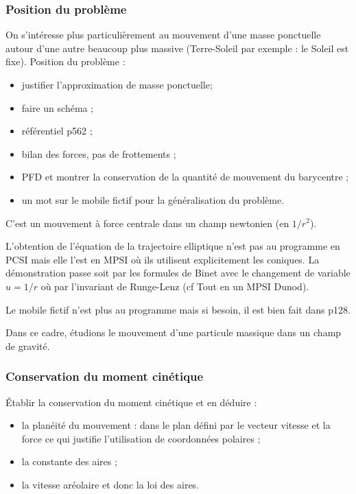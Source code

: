 \subsubsection{Position du problème}

On s'intéresse plus particulièrement au mouvement d'une masse ponctuelle autour d'une autre beaucoup plus massive (Terre-Soleil par exemple : le Soleil est fixe).
Position du problème :
\begin{itemize}
\item justifier l'approximation de masse ponctuelle;
\item faire un schéma ;
\item référentiel \cite{Salamito2016} p562 ;
\item bilan des forces, pas de frottements ;
\item PFD et montrer la conservation de la quantité de mouvement du barycentre ;
\item un mot sur le mobile fictif pour la généralisation du problème.
\end{itemize}

C'est un mouvement à force centrale dans un champ newtonien (en $1/r^2$).

\begin{remarque}
L'obtention de l'équation de la trajectoire elliptique n'est pas au programme en PCSI mais elle l'est en MPSI où ils utilisent explicitement les coniques.
La démonstration passe soit par les formules de Binet avec le changement de variable $u=1/r$ où par l'invariant de Runge-Lenz (cf Tout en un MPSI Dunod).

\noindent
Le mobile fictif n'est plus au programme mais si besoin, il est bien fait dans \cite{Bocquet2002} p128.
\end{remarque}

\begin{transition}
Dans ce cadre, étudions le mouvement d'une particule massique dans un champ de gravité.
\end{transition}

\subsubsection{Conservation du moment cinétique}

Établir la conservation du moment cinétique et en déduire :
\begin{itemize}
\item la planéité du mouvement : dans le plan défini par le vecteur vitesse et la force ce qui justifie l'utilisation de coordonnées polaires ;
\item la constante des aires ;
\item la vitesse aréolaire et donc la loi des aires.
\end{itemize}


